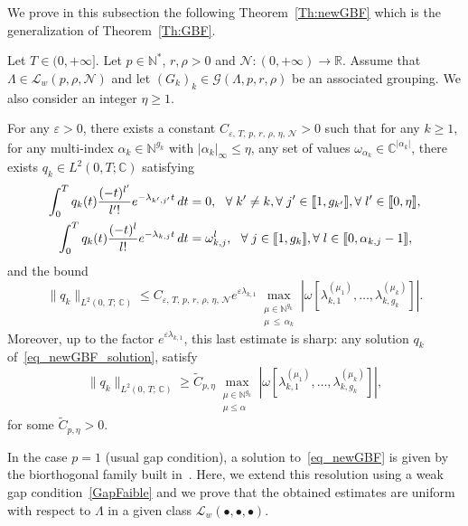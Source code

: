 \documentclass[AHL,Unicode,longabstracts]{cedram}
\newcommand{\llbracket}{\mathopen{[\mkern -2.7mu[}}
\newcommand{\rrbracket}{\mathclose{]\mkern -2.7mu]}}
\newcommand{\inter}[2]{\llbracket #1,#2 \rrbracket}
\newcommand{\n}{g}
\newcommand{\LL}{\mathcal{L}}
\newcommand{\NN}{\mathcal{N}}
\newcommand{\N}{\mathbb{N}}
\newcommand{\R}{\mathbb{R}}
\newcommand{\C}{\mathbb{C}}
\renewcommand{\cdot}{{\scriptstyle \bullet}}
\let\oldforall\forall
\renewcommand*{\forall}{\mathrel{\oldforall}}
\begin{document}
We prove in this subsection the following Theorem~\ref{Th:newGBF} which is the generalization of Theorem~\ref{Th:GBF}.
\begin{theo} \label{Th:newGBF}
Let $T \in (0,+\infty]$. Let $p \in \N^*$, $r, \rho > 0$ and $\NN : (0,+\infty) \to \R$. Assume that $\Lambda \in \LL_w(p,\rho, \NN)$ and let $(G_k)_k\in \mathcal{G}(\Lambda,p,r,\rho)$ be an associated grouping. We also consider an integer $\eta\geq 1$.

For any $\varepsilon > 0$, there exists a constant $C_{\varepsilon,\, T,\, p,\, r,\, \rho,\, \eta,\, \NN} >0$ such that for any $k \geq 1$, for any multi-index $\alpha_k\in \N^{\n_k}$ with $|\alpha_k|_\infty\leq \eta$, any set of values $\omega_{\alpha_k} \in \C^{|\alpha_k|}$, there exists $q_k \in L^2(0,T; \C)$ satisfying
\begin{subequations}\label{eq_newGBF}
\begin{align}
\int_0^{T} q_k(t) \frac{(-t)^{l'}}{l'!} e^{-\lambda_{k',j'}t} \, dt & = 0, \ \ \forall k'\neq k, \forall j'\in \inter{1}{\n_{k'}}, \forall l'\in \inter{0}{\eta}, \label{eq_newGBF_orthogonalite}
\\
\int_0^{T} q_k(t) \frac{(-t)^l}{l!} e^{-\lambda_{k,j}t} \, dt & = \omega_{k,j}^l, \ \ \forall j\in \inter{1}{\n_{k}}, \forall l\in \inter{0}{\alpha_{k,j}-1}, \label{eq_newGBF_solution}
\end{align}
\end{subequations}
and the bound
\begin{equation}\label{bound_qk_multiplicities}
\|q_k\|_{L^2(0,\,T;\,\C)}\leq C_{\varepsilon,\, T,\, p,\, r,\, \rho,\, \eta,\, \NN} e^{\varepsilon \lambda_{k,1}} \max\limits_{\substack{\mu\in \N^{\n_k} \\ \mu\,\leq\,\alpha_k}} \left| \omega[\lambda_{k,1}^{(\mu_1)},\dotsc,\lambda_{k,\n_k}^{(\mu_k)}] \right|.
\end{equation}
Moreover, up to the factor $e^{\varepsilon \lambda_{k,1}}$, this last estimate is sharp: any solution $q_k$ of~\eqref{eq_newGBF_solution}, satisfy
\begin{equation}\label{lower_bound_qk_multiplicities}
\|q_k\|_{L^2(0,\,T;\,\C)} \geq \widetilde{C}_{p, \eta} \max\limits_{\substack{\mu\in \N^{\n_k} \\ \mu\leq \alpha}} \left| \omega[\lambda_{k,1}^{(\mu_1)},\dotsc,\lambda_{k,\n_k}^{(\mu_k)}] \right|,
\end{equation}
for some $\widetilde{C}_{p, \eta}>0$.
\end{theo}

In the case $p=1$ (usual gap condition), a solution to~\eqref{eq_newGBF} is given by the biorthogonal family built in~\cite{AKBGBDT_Kalman}. Here, we extend this resolution using a weak gap condition~\eqref{GapFaible} and we prove that the obtained estimates are uniform with respect to $\Lambda$ in a given class $\LL_w(\cdot, \cdot, \cdot)$.
\end{document}

